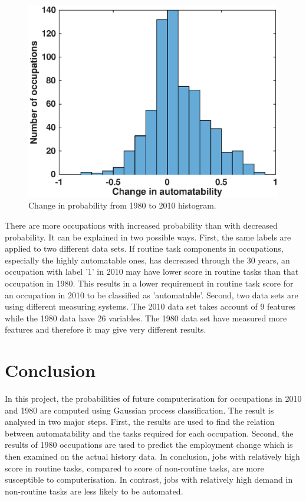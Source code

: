 \documentclass[11pt]{report}
\numberwithin{equation}{chapter}
\begin{document}
\begin{spacing}{2}
\begin{figure}[!htb]
\centering
\includegraphics[scale=0.75]{hist.eps}
\caption{Change in probability from 1980 to 2010 histogram. }
\label{fig:hist}
\end{figure}

There are more occupations with increased probability than with decreased probability. It can be explained in two possible ways. First, the same labels are applied to two different data sets. If routine task components in occupations, especially the highly automatable ones, has decreased through the 30 years, an occupation with label '1' in 2010 may have lower score in routine tasks than that occupation in 1980. This results in a lower requirement in routine task score for an occupation in 2010 to be classified as 'automatable'. Second, two data sets are using different measuring systems. The 2010 data set takes account of 9 features while the 1980 data have 26 variables. The 1980 data set have measured more features and therefore it may give very different results. 


\chapter{Conclusion}
\rhead{}
In this project, the probabilities of future computerisation for occupations in 2010 and 1980 are computed using Gaussian process classification. The result is analysed in two major steps. First, the results are used to find the relation between automatability and the tasks required for each occupation. Second, the results of 1980 occupations are used to predict the employment change which is then examined on the actual history data. In conclusion, jobs with relatively high score in routine tasks, compared to score of non-routine tasks, are more susceptible to computerisation. In contrast, jobs with relatively high demand in non-routine tasks are less likely to be automated. 


\end{spacing}
\end{document}
